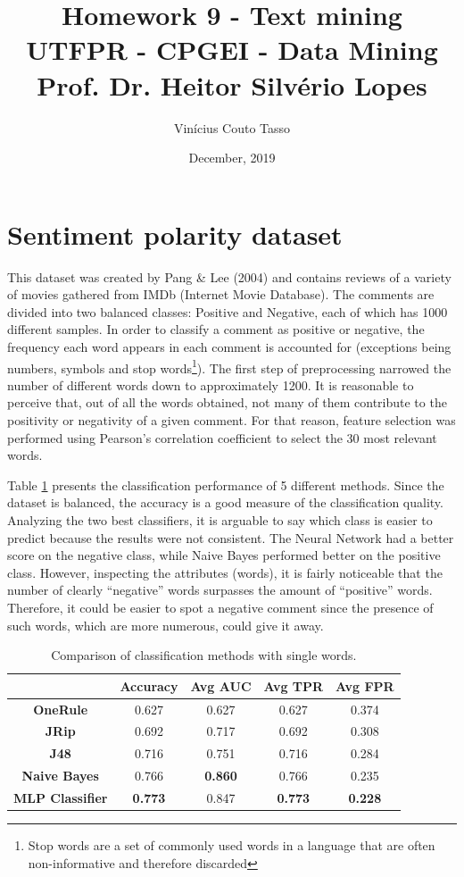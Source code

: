 \documentclass{article}
\title{Homework 9 - Text mining \\
        \vspace{5px} \large UTFPR - CPGEI - Data Mining \\
        Prof. Dr. Heitor Silvério Lopes}
\author{Vinícius Couto Tasso}
\date{December, 2019}
\begin{document}
\maketitle

\section*{Sentiment polarity dataset}

This dataset was created by Pang \& Lee (2004) and contains reviews of a variety of movies gathered from IMDb (Internet Movie Database). The comments are divided into two balanced classes: Positive and Negative, each of which has 1000 different samples. In order to classify a comment as positive or negative, the frequency each word appears in each comment is accounted for (exceptions being numbers, symbols and stop words\footnote{Stop words are a set of commonly used words in a language that are often non-informative and therefore discarded}). The first step of preprocessing narrowed the number of different words down to approximately 1200. It is reasonable to perceive that, out of all the words obtained, not many of them contribute to the positivity or negativity of a given comment. For that reason, feature selection was performed using Pearson's correlation coefficient to select the 30 most relevant words.

Table \ref{tab:res1} presents the classification performance of 5 different methods. Since the dataset is balanced, the accuracy is a good measure of the classification quality. Analyzing the two best classifiers, it is arguable to say which class is easier to predict because the results were not consistent. The Neural Network had a better score on the negative class, while Naive Bayes performed better on the positive class. However, inspecting the attributes (words), it is fairly noticeable that the number of clearly ``negative'' words surpasses the amount of ``positive'' words. Therefore, it could be easier to spot a negative comment since the presence of such words, which are more numerous, could give it away.

\begin{table}[htpb]
    \centering
    \begin{tabular}{c|c|c|c|c}
         &  \textbf{Accuracy} & \textbf{Avg AUC} & \textbf{Avg TPR} & \textbf{Avg FPR} \\ \hline
         \textbf{OneRule} & 0.627 & 0.627 & 0.627 & 0.374 \\  
         \textbf{JRip} & 0.692 & 0.717 & 0.692 & 0.308 \\ 
         \textbf{J48} & 0.716 & 0.751 & 0.716 & 0.284 \\ 
         \textbf{Naive Bayes} & 0.766 & \textbf{0.860} & 0.766 & 0.235 \\
         \textbf{MLP Classifier} & \textbf{0.773} & 0.847 & \textbf{0.773} & \textbf{0.228} 
    \end{tabular}
    \caption{Comparison of classification methods with single words.}
    \label{tab:res1}
\end{table}
\end{document}
